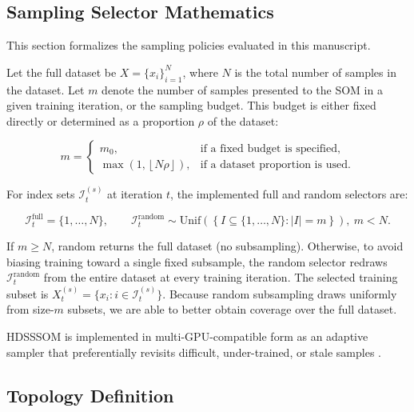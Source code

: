 \documentclass[10pt]{article} %
\begin{document}
\subsection{Sampling Selector Mathematics}

This section formalizes the sampling policies evaluated in this manuscript.

Let the full dataset be $X=\{x_i\}_{i=1}^{N}$, where $N$ is the total number of samples in the dataset. Let $m$ denote the number of samples presented to the SOM in a given training iteration, or the sampling budget. This budget is either fixed directly or determined as a proportion $\rho$ of the dataset:

\begin{equation*}
m=
\begin{cases}
m_0, & \text{if a fixed budget is specified},\\[4pt]
\max\!\left(1,\left\lfloor N\rho \right\rfloor\right), & \text{if a dataset proportion is used}.
\end{cases}
\tag{1}
\end{equation*}

For index sets $\mathcal{I}_t^{(s)}$ at iteration $t$, the implemented full and random selectors are:

\begin{equation*}
\mathcal{I}_t^{\mathrm{full}}=\{1,\dots,N\},
\qquad
\mathcal{I}_t^{\mathrm{random}} \sim \mathrm{Unif}\!\left(\left\{I\subseteq\{1,\dots,N\}:|I|=m\right\}\right),\ m<N.
\tag{2}
\end{equation*}

If $m\ge N$, random returns the full dataset (no subsampling). Otherwise, to avoid biasing training toward a single fixed subsample, the random selector redraws $\mathcal{I}_t^{\mathrm{random}}$ from the entire dataset at every training iteration. The selected training subset is $X_t^{(s)}=\{x_i:i\in\mathcal{I}_t^{(s)}\}$. Because random subsampling draws uniformly from size-$m$ subsets, we are able to better obtain coverage over the full dataset.

HDSSSOM is implemented in multi-GPU-compatible form as an adaptive sampler that preferentially revisits difficult, under-trained, or stale samples \citep{wetmoreSpeedingSelfOrganizingFeature2005}.

\subsection{Topology Definition}
\end{document}
